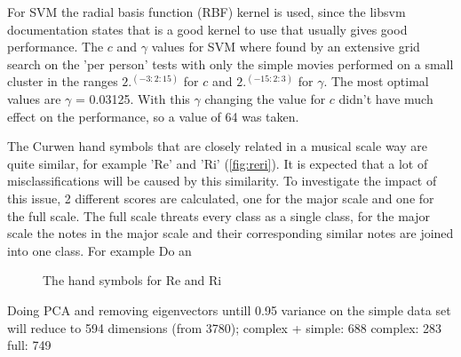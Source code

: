 For SVM the radial basis function (RBF) kernel is used, since the libsvm documentation states that is a good kernel to use that usually gives good performance. The $c$ and $\gamma$ values for SVM where found by an extensive grid search on the 'per person' tests with only the simple movies performed on a small cluster in the ranges $2.^(-3:2:15)$ for $c$ and $2.^(-15:2:3)$ for $\gamma$. The most optimal values are $\gamma$ = 0.03125. With this $\gamma$ changing the value for $c$ didn't have much effect on the performance, so a value of 64 was taken.

The Curwen hand symbols that are closely related in a musical scale way are quite similar, for example 'Re' and 'Ri' (\autoref{fig:reri}). It is expected that a lot of misclassifications will be caused by this similarity. To investigate the impact of this issue, 2 different scores are calculated, one for the major scale and one for the full scale. The full scale threats every class as a single class, for the major scale the notes in the major scale and their corresponding similar notes are joined into one class. For example Do an

\begin{figure}[htbp]
  \centering
{}
\hspace{0.03\linewidth}
  \caption{The hand symbols for Re and Ri}
  \label{fig:reri}
\end{figure}




Doing PCA and removing eigenvectors untill 0.95 variance on the simple data set will reduce to  594 dimensions (from 3780);
complex + simple: 688
complex:  283
full: 749


